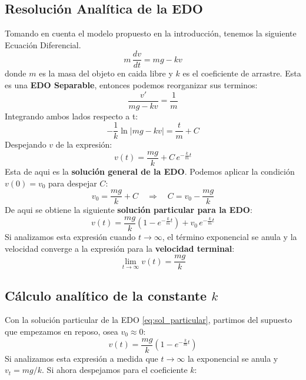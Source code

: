 \documentclass[12pt, journal]{IEEEtran}
\begin{document}
	\subsection{Resolución Analítica de la EDO}
	Tomando en cuenta el modelo propuesto en la introducción, tenemos la siguiente Ecuación Diferencial.
	\begin{equation}
        m\,\frac{dv}{dt} = mg - kv
	\end{equation}
	donde $m$ es la masa del objeto en caida libre y $k$ es el coeficiente de arrastre.
	Esta es una \textbf{EDO Separable}, entonces podemos reorganizar sus terminos:
	\begin{equation}
        \frac{v'}{mg - kv} = \frac{1}{m}
	\end{equation}
	Integrando ambos lados respecto a t:
	\begin{equation}
        -\frac{1}{k}\ln\left|mg - kv\right| = \frac{t}{m} + C
	\end{equation}
	Despejando $v$ de la expresión:
	\begin{equation}
        v(t) = \frac{mg}{k} + C\,e^{-\tfrac{k}{m}t}
	\end{equation}
	Esta de aqui es la  \textbf{solución general de la EDO}. Podemos aplicar la condición $v(0) = v_0$ para despejar $C$:
	\begin{equation}
        v_0 = \frac{mg}{k} + C \quad\Rightarrow\quad C = v_0 - \frac{mg}{k}
	\end{equation}
	De aqui se obtiene la siguiente \textbf{solución particular para la EDO}:
	\begin{equation}
        \boxed{v(t) = \frac{mg}{k}\!\left(1 - e^{-\tfrac{k}{m}t}\right) + v_0\,e^{-\tfrac{k}{m}t}}
        \label{eq:sol_particular}
	\end{equation}
	Si analizamos esta expresión cuando $t \to \infty$, el término exponencial se anula y la velocidad converge a la expresión para la \textbf{velocidad terminal}:
	\begin{equation}
        \lim_{t\to\infty} v(t) = \frac{mg}{k}
	\end{equation}


	\subsection{Cálculo analítico de la constante \boldmath$k$}

	Con la solución particular de la EDO \eqref{eq:sol_particular}, partimos del supuesto que empezamos en reposo, osea  $v_0 \approx 0$:
	\begin{equation}
        v(t) = \frac{mg}{k}\!\left(1 - e^{-\tfrac{k}{m}t}\right)
	\end{equation}
	Si analizamos esta expresión a medida que $t \to \infty$ la exponencial se anula y $v_t = mg/k$.
	Si ahora despejamos para el coeficiente \boldmath$k$:
\end{document}
